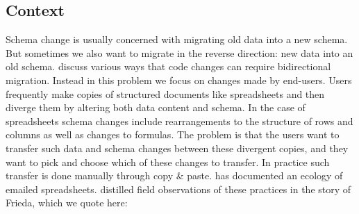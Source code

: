 \documentclass[english,submission]{programming}
\begin{document}
\subsection{Context}
Schema change is usually concerned with migrating old data into a new schema. But sometimes we also want to migrate in the reverse direction: new data into an old schema. \citet{Cambria} discuss various ways that code changes can require bidirectional migration. Instead in this problem we focus on changes made by end-users. Users frequently make copies of structured documents like spreadsheets and then diverge them by altering both data content and schema. In the case of spreadsheets schema changes include rearrangements to the structure of rows and columns as well as changes to formulas. The problem is that the users want to transfer such data and schema changes between these divergent copies, and they want to pick and choose which of these changes to transfer. In practice such transfer is done manually through copy \& paste. \citet{Basman19} has documented an ecology of emailed spreadsheets. \citet{Burnett14} distilled field observations of these practices in the story of Frieda, which we quote here:
\end{document}
